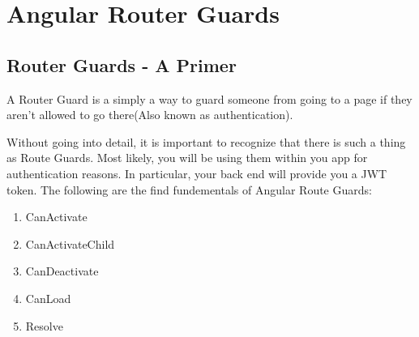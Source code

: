 \maketitle{}
\section{ Angular Router Guards }

\subsection{ Router Guards - A Primer }
A Router Guard is a simply a way to guard someone from going to a page if they
aren't allowed to go there(Also known as authentication).

Without going into detail, it is important to recognize that there is such a
thing as Route Guards. Most likely, you will be using them within you app
for authentication reasons. In particular, your back end will provide you a JWT
token. The following are the find fundementals of Angular Route Guards:
\begin{enumerate}
  \item CanActivate
  \item CanActivateChild
  \item CanDeactivate
  \item CanLoad
  \item Resolve
\end{enumerate}

